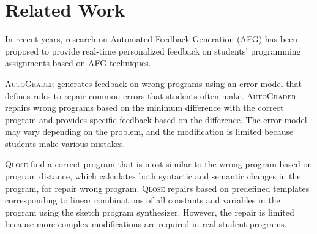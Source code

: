 \documentclass[10pt,conference]{IEEEtran}
\begin{document}
\section{Related Work}
        In recent years, research on Automated Feedback Generation (AFG) has been proposed to provide real-time personalized feedback on students' programming assignments based on AFG techniques.
        
        \textsc{AutoGrader} \cite{singh2013automated} generates feedback on wrong programs using an error model that defines rules to repair common errors that students often make. \textsc{AutoGrader} repairs wrong programs based on the minimum difference with the correct program and provides specific feedback based on the difference. The error model may vary depending on the problem, and the modification is limited because students make various mistakes.
        
        \textsc{Qlose} \cite{d2016qlose} find a correct program that is most similar to the wrong program based on program distance, which calculates both syntactic and semantic changes in the program, for repair wrong program. \textsc{Qlose} repairs based on predefined templates corresponding to linear combinations of all constants and variables in the program using the sketch program synthesizer. However, the repair is limited because more complex modifications are required in real student programs.
        
\end{document}
